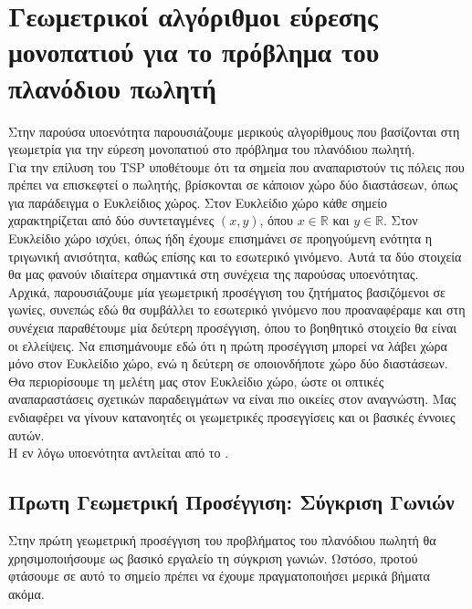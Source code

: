 \documentclass[oneside,12pt]{book}
\newcommand{\R}{\mathbb{R}}
\theoremstyle{definition}
\begin{document}
\section{Γεωμετρικοί αλγόριθμοι εύρεσης μονοπατιού για το πρόβλημα του πλανόδιου πωλητή}

Στην παρούσα υποενότητα παρουσιάζουμε μερικούς αλγορίθμους που βασίζονται στη γεωμετρία για την εύρεση μονοπατιού στο πρόβλημα του πλανόδιου πωλητή. \\

Για την επίλυση του TSP υποθέτουμε ότι τα σημεία που αναπαριστούν τις πόλεις που πρέπει να επισκεφτεί ο πωλητής, βρίσκονται σε κάποιον χώρο δύο διαστάσεων, όπως για παράδειγμα ο Ευκλείδιος χώρος. Στον Ευκλείδιο χώρο κάθε σημείο χαρακτηρίζεται από δύο συντεταγμένες \((x,y)\), όπου \(x \in \R\) και \(y \in \R\). Στον Ευκλείδιο χώρο ισχύει, όπως ήδη έχουμε επισημάνει σε προηγούμενη ενότητα η τριγωνική ανισότητα, καθώς επίσης και το εσωτερικό γινόμενο. Αυτά τα δύο στοιχεία θα μας φανούν ιδιαίτερα σημαντικά στη συνέχεια της παρούσας υποενότητας. \\

Αρχικά, παρουσιάζουμε μία γεωμετρική προσέγγιση του ζητήματος βασιζόμενοι σε γωνίες, συνεπώς εδώ θα συμβάλλει το εσωτερικό γινόμενο που προαναφέραμε και στη συνέχεια παραθέτουμε μία δεύτερη προσέγγιση, όπου το βοηθητικό στοιχείο θα είναι οι ελλείψεις. Να επισημάνουμε εδώ ότι η πρώτη προσέγγιση μπορεί να λάβει χώρα μόνο στον Ευκλείδιο χώρο, ενώ η δεύτερη σε οποιονδήποτε χώρο δύο διαστάσεων. Θα περιορίσουμε τη μελέτη μας στον Ευκλείδιο χώρο, ώστε οι οπτικές αναπαραστάσεις σχετικών παραδειγμάτων να είναι πιο οικείες στον αναγνώστη. Μας ενδιαφέρει να γίνουν κατανοητές οι γεωμετρικές προσεγγίσεις και οι βασικές έννοιες αυτών. \\

Η εν λόγω υποενότητα αντλείται από το \cite{16}.

\subsection{Πρωτη Γεωμετρική Προσέγγιση: Σύγκριση Γωνιών} 

Στην πρώτη γεωμετρική προσέγγιση του προβλήματος του πλανόδιου πωλητή θα χρησιμοποιήσουμε ως βασικό εργαλείο τη σύγκριση γωνιών. Ωστόσο, προτού φτάσουμε σε αυτό το σημείο πρέπει να έχουμε πραγματοποιήσει μερικά βήματα ακόμα. \\
\end{document}
